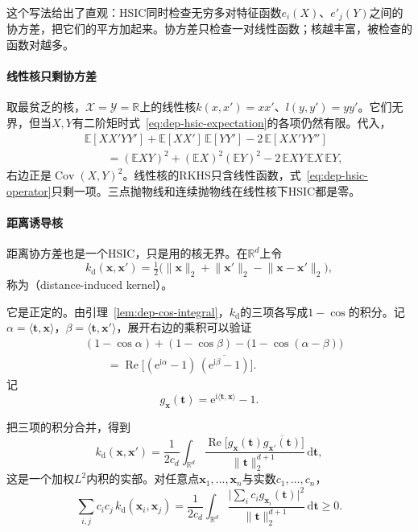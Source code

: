 这个写法给出了直观：HSIC同时检查无穷多对特征函数$e_i(X)$、$e'_j(Y)$之间的协方差，把它们的平方加起来。协方差只检查一对线性函数；核越丰富，被检查的函数对越多。

\paragraph{线性核只剩协方差}
取最贫乏的核，$\mathcal{X}=\mathcal{Y}=\mathbb{R}$上的线性核$k(x,x')=xx'$、$l(y,y')=yy'$。它们无界，但当$X,Y$有二阶矩时式~\eqref{eq:dep-hsic-expectation}的各项仍然有限。代入，
\[
  \begin{aligned}
  &\mathbb{E}[XX'YY']+\mathbb{E}[XX']\,\mathbb{E}[YY']-2\,\mathbb{E}[XX'YY'']\\
  &\qquad=(\mathbb{E}XY)^{2}+(\mathbb{E}X)^{2}(\mathbb{E}Y)^{2}-2\,\mathbb{E}XY\,\mathbb{E}X\,\mathbb{E}Y ,
  \end{aligned}
\]
右边正是$\operatorname{Cov}(X,Y)^{2}$。线性核的RKHS只含线性函数，式~\eqref{eq:dep-hsic-operator}只剩一项。三点抛物线和连续抛物线在线性核下HSIC都是零。

\paragraph{距离诱导核}
距离协方差也是一个HSIC，只是用的核无界。在$\mathbb{R}^{d}$上令
\[
  k_{\mathrm{d}}(\bm{x},\bm{x}')=\tfrac12\bigl(\lVert\bm{x}\rVert_2+\lVert\bm{x}'\rVert_2-\lVert\bm{x}-\bm{x}'\rVert_2\bigr),
\]
称为（distance-induced kernel）。

它是正定的。由引理~\ref{lem:dep-cos-integral}，$k_{\mathrm{d}}$的三项各写成$1-\cos$的积分。记$\alpha=\langle\bm{t},\bm{x}\rangle$，$\beta=\langle\bm{t},\bm{x}'\rangle$，展开右边的乘积可以验证
\[
  \begin{aligned}
  &(1-\cos\alpha)+(1-\cos\beta)-\bigl(1-\cos(\alpha-\beta)\bigr)\\
  &\qquad=\operatorname{Re}\bigl[(\mathrm{e}^{\mathrm{i}\alpha}-1)\,\overline{(\mathrm{e}^{\mathrm{i}\beta}-1)}\bigr].
  \end{aligned}
\]
记
\[
  g_{\bm{x}}(\bm{t})=\mathrm{e}^{\mathrm{i}\langle\bm{t},\bm{x}\rangle}-1 .
\]

把三项的积分合并，得到
\[
  k_{\mathrm{d}}(\bm{x},\bm{x}')=\frac{1}{2c_d}\int_{\mathbb{R}^{d}}\frac{\operatorname{Re}\bigl[g_{\bm{x}}(\bm{t})\overline{g_{\bm{x}'}(\bm{t})}\bigr]}{\lVert\bm{t}\rVert_2^{d+1}}\,\mathrm{d}\bm{t},
\]
这是一个加权$L^{2}$内积的实部。对任意点$\bm{x}_1,\dots,\bm{x}_n$与实数$c_1,\dots,c_n$，
\[
  \sum_{i,j}c_ic_j\,k_{\mathrm{d}}(\bm{x}_i,\bm{x}_j)=\frac{1}{2c_d}\int_{\mathbb{R}^{d}}\frac{\bigl\lvert\sum_ic_ig_{\bm{x}_i}(\bm{t})\bigr\rvert^{2}}{\lVert\bm{t}\rVert_2^{d+1}}\,\mathrm{d}\bm{t}\geq0 .
\]

